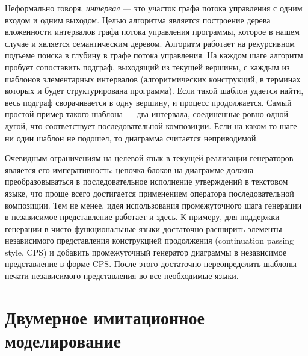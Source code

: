 \documentclass[a5paper]{article}
\begin{document}
Неформально говоря, \textit{интервал} --- это участок графа потока управления с одним входом и одним выходом. Целью алгоритма является построение дерева вложенности интервалов графа потока управления программы, которое в нашем случае и является семантическим деревом. Алгоритм работает на рекурсивном подъеме поиска в глубину в графе потока управления. На каждом шаге алгоритм пробует сопоставить подграф, выходящий из текущей вершины, с каждым из шаблонов элементарных интервалов (алгоритмических конструкций, в терминах которых и будет структурирована программа). Если такой шаблон удается найти, весь подграф сворачивается в одну вершину, и процесс продолжается. Самый простой пример такого шаблона --- два интервала, соединенные ровно одной дугой, что соответствует последовательной композиции. Если на каком-то шаге ни один шаблон не подошел, то диаграмма считается неприводимой.

Очевидным ограничениям на целевой язык в текущей реализации генераторов является его императивность: цепочка блоков на диаграмме должна преобразовываться в последовательное исполнение утверждений в текстовом языке, что проще всего достигается применением оператора последовательной композиции. Тем не менее, идея использования промежуточного шага генерации в независимое представление работает и здесь. К примеру, для поддержки генерации в чисто функциональные языки достаточно расширить элементы независимого представления конструкцией продолжения (continuation passing style, CPS) и добавить промежуточный генератор диаграммы в независимое представление в форме CPS. После этого достаточно переопределить шаблоны печати независимого представления во все необходимые языки.

\section{Двумерное имитационное моделирование}
\label{chapter:2dModel}
\end{document}
